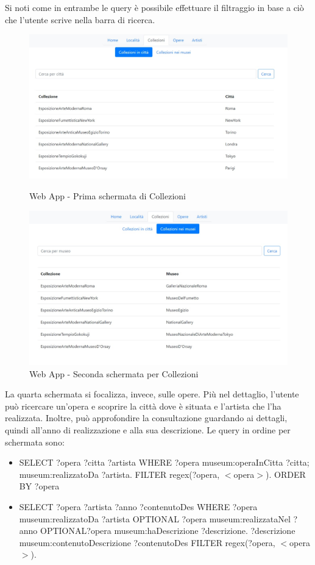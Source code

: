 \documentclass[12pt]{article}
\begin{document}
Si noti come in entrambe le query è possibile effettuare il filtraggio in base a ciò che l’utente scrive nella barra di ricerca.

\begin{figure}[!h]
   \centering
   \includegraphics[scale=0.6]{fig/Schermata 3.1 webapp.jpg}
   \caption{Web App - Prima schermata di Collezioni}\label{fig:picture}
      \includegraphics[scale=0.6]{fig/Schermata 3.2 webapp.jpg}
   \caption{Web App - Seconda schermata per Collezioni}\label{fig:picture}
\end{figure}

\newpage
La quarta schermata si focalizza, invece, sulle opere. Più nel dettaglio, l’utente può ricercare un’opera e scoprire la città dove è situata e l’artista che l’ha realizzata. Inoltre, può approfondire la consultazione guardando ai dettagli, quindi all’anno di realizzazione e alla sua descrizione.
Le query in ordine per schermata sono:
\begin{itemize}
 \item SELECT ?opera ?citta ?artista WHERE { ?opera museum:operaInCitta ?citta; museum:realizzatoDa ?artista. FILTER regex(?opera, $<$opera$>$).} ORDER BY ?opera
 \item SELECT ?opera ?artista ?anno ?contenutoDes WHERE{ ?opera museum:realizzatoDa ?artista OPTIONAL {?opera museum:realizzataNel ?anno} OPTIONAL{?opera museum:haDescrizione ?descrizione. ?descrizione museum:contenutoDescrizione ?contenutoDes}  FILTER regex(?opera, $<$opera$>$).}
\end{itemize} 
\end{document}
